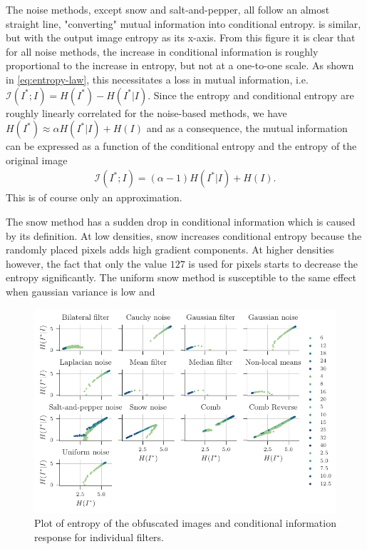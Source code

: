 The noise methods, except snow and salt-and-pepper, all follow an almost straight line, "converting" mutual information into conditional entropy.  is similar, but with the output image entropy as its x-axis. From this figure it is clear that for all noise methods, the increase in conditional information is roughly proportional to the increase in entropy, but not at a one-to-one scale. As shown in \cref{eq:entropy-law}, this necessitates a loss in mutual information, i.e. $\mathcal{I}(I^*;I) = H(I^*) - H(I^*|I)$. Since the entropy and conditional entropy are roughly linearly correlated for the noise-based methods, we have $H(I^*) \approx \alpha H(I^*|I) + H(I)$ and as a consequence, the mutual information can be expressed as a function of the conditional entropy and the entropy of the original image 
\begin{align*}
\mathcal{I}(I^*;I) = (\alpha-1)H(I^*|I) + H(I).
\end{align*}
This is of course only an approximation.

The snow method has a sudden drop in conditional information which is caused by its definition. At low densities, snow increases conditional entropy because the randomly placed pixels adds high gradient components. At higher densities however, the fact that only the value $127$ is used for pixels starts to decrease the entropy significantly. The uniform snow method is susceptible to the same effect when gaussian variance is low and 

\begin{figure}
	\centering
	
	\includegraphics[width=1\textwidth]{figures/results/individual-ent}
	
	\caption{Plot of entropy of the obfuscated images and conditional information response for individual filters.}\label{fig:individual-entropy}
\end{figure}


